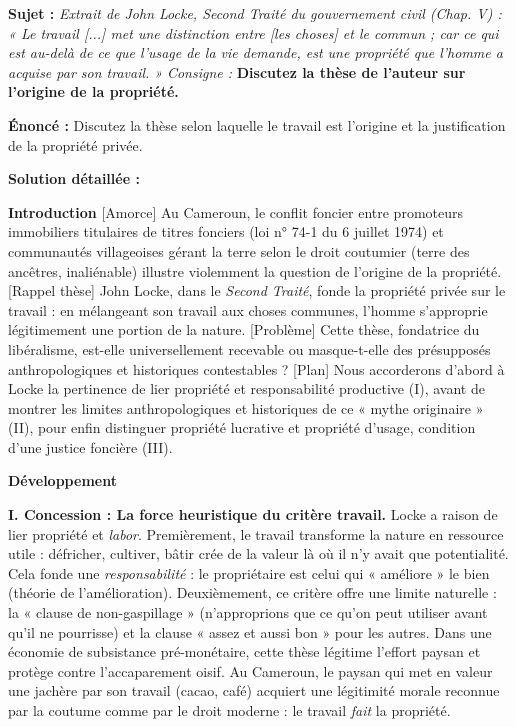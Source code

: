 \documentclass[11pt]{article}
\newcounter{popsec}
\newcounter{popsub}
\newcommand{\courssub}[1]{%
  \stepcounter{popsub}%
  \par\vspace{9pt}\noindent{\popxbold\fontsize{11.5}{13}\selectfont\color{popink}{\color{poporange}\thepopsec.\thepopsub}\hspace{6pt}#1}\par\nopagebreak\vspace{4pt}
}
\begin{document}
\courssub{Exercice résolu : Simulation Q3 (8 pts)}

\textbf{Sujet :} \textit{Extrait de John Locke, \emph{Second Traité du gouvernement civil} (Chap. V) : « Le travail [...] met une distinction entre [les choses] et le commun ; car ce qui est au-delà de ce que l'usage de la vie demande, est une propriété que l'homme a acquise par son travail. »}
\textit{Consigne :} \textbf{Discutez la thèse de l'auteur sur l'origine de la propriété.}

\begin{exoresolu}
\textbf{Énoncé :} Discutez la thèse selon laquelle le travail est l'origine et la justification de la propriété privée.

\textbf{Solution détaillée :}

\tcblower

\textbf{Introduction}
[Amorce] Au Cameroun, le conflit foncier entre promoteurs immobiliers titulaires de titres fonciers (loi n° 74-1 du 6 juillet 1974) et communautés villageoises gérant la terre selon le droit coutumier (terre des ancêtres, inaliénable) illustre violemment la question de l'origine de la propriété. [Rappel thèse] John Locke, dans le \emph{Second Traité}, fonde la propriété privée sur le travail : en mélangeant son travail aux choses communes, l'homme s'approprie légitimement une portion de la nature. [Problème] Cette thèse, fondatrice du libéralisme, est-elle universellement recevable ou masque-t-elle des présupposés anthropologiques et historiques contestables ? [Plan] Nous accorderons d'abord à Locke la pertinence de lier propriété et responsabilité productive (I), avant de montrer les limites anthropologiques et historiques de ce « mythe originaire » (II), pour enfin distinguer propriété lucrative et propriété d'usage, condition d'une justice foncière (III).

\textbf{Développement}

\textbf{I. Concession : La force heuristique du critère travail.}
Locke a raison de lier propriété et \emph{labor}. Premièrement, le travail transforme la nature en ressource utile : défricher, cultiver, bâtir crée de la valeur là où il n'y avait que potentialité. Cela fonde une \emph{responsabilité} : le propriétaire est celui qui « améliore » le bien (théorie de l'amélioration). Deuxièmement, ce critère offre une limite naturelle : la « clause de non-gaspillage » (n'approprions que ce qu'on peut utiliser avant qu'il ne pourrisse) et la clause « assez et aussi bon » pour les autres. Dans une économie de subsistance pré-monétaire, cette thèse légitime l'effort paysan et protège contre l'accaparement oisif. Au Cameroun, le paysan qui met en valeur une jachère par son travail (cacao, café) acquiert une légitimité morale reconnue par la coutume comme par le droit moderne : le travail \emph{fait} la propriété.


\end{exoresolu}
\end{document}
